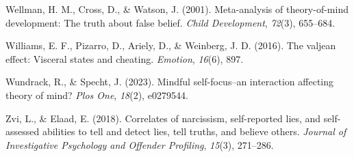 \documentclass[
  man,mask,floatsintext]{apa6}
\newlength{\cslhangindent}
\newlength{\cslentryspacingunit} %
\newenvironment{CSLReferences}[2] %
 {%
  \setlength{\parindent}{0pt}
  \ifodd #1
  \let\oldpar\par
  \def\par{\hangindent=\cslhangindent\oldpar}
  \fi
  \setlength{\parskip}{#2\cslentryspacingunit}
 }%
 {}
\begin{document}
\begin{CSLReferences}{1}{0}
\leavevmode{}%
Wellman, H. M., Cross, D., \& Watson, J. (2001). Meta-analysis of theory-of-mind development: The truth about false belief. \emph{Child Development}, \emph{72}(3), 655--684.

\leavevmode{}%
Williams, E. F., Pizarro, D., Ariely, D., \& Weinberg, J. D. (2016). The valjean effect: Visceral states and cheating. \emph{Emotion}, \emph{16}(6), 897.

\leavevmode{}%
Wundrack, R., \& Specht, J. (2023). Mindful self-focus--an interaction affecting theory of mind? \emph{Plos One}, \emph{18}(2), e0279544.

\leavevmode{}%
Zvi, L., \& Elaad, E. (2018). Correlates of narcissism, self-reported lies, and self-assessed abilities to tell and detect lies, tell truths, and believe others. \emph{Journal of Investigative Psychology and Offender Profiling}, \emph{15}(3), 271--286.

\end{CSLReferences}

\endgroup
\end{document}

